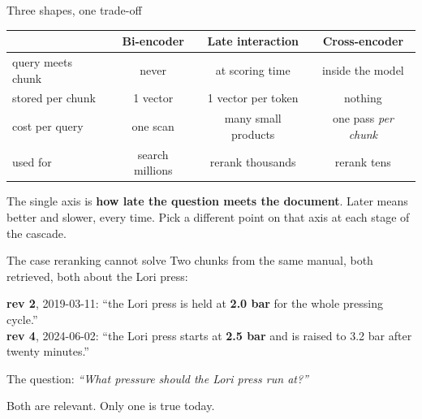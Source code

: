 \documentclass[aspectratio=169]{beamer}
\newcommand{\takebox}[1]{%
  \begin{tcolorbox}[colback=paramgreen!8, colframe=paramgreen, boxrule=0.6pt, arc=2pt]
  #1
  \end{tcolorbox}}
\begin{document}
\begin{frame}{Three shapes, one trade-off}
  \vspace{0.7em}
  \begin{center}
  \small
  \begin{tabular}{lccc}
    \toprule
    & \textbf{Bi-encoder} & \textbf{Late interaction} & \textbf{Cross-encoder} \\
    \midrule
    query meets chunk & never & at scoring time & inside the model \\
    stored per chunk  & 1 vector & 1 vector per token & nothing \\
    cost per query    & one scan & many small products & one pass \emph{per chunk} \\
    used for          & search millions & rerank thousands & rerank tens \\
    \bottomrule
  \end{tabular}
  \end{center}

  \vspace{1.0em}
  \takebox{The single axis is \textbf{how late the question meets the document}. Later means
  better and slower, every time. Pick a different point on that axis at each stage of the
  cascade.}
\end{frame}

\begin{frame}{The case reranking cannot solve}
  \vspace{0.5em}
  Two chunks from the same manual, both retrieved, both about the Lori press:

  \vspace{0.5em}
  \begin{center}
  \begin{tcolorbox}[colback=lightbg, colframe=gray, boxrule=0.5pt, arc=2pt, width=0.92\textwidth]
    \small
    \textbf{rev 2}, 2019-03-11: ``the Lori press is held at \textbf{2.0 bar} for the whole
    pressing cycle.''\\[0.35em]
    \textbf{rev 4}, 2024-06-02: ``the Lori press starts at \textbf{2.5 bar} and is raised to
    3.2 bar after twenty minutes.''
  \end{tcolorbox}
  \end{center}

  \vspace{0.7em}
  \begin{center}
    {\large The question: \textit{``What pressure should the Lori press run at?''}}
  \end{center}

  \vspace{0.7em}
  \begin{center}
  {\small\color{gray}Both are relevant. Only one is true today.}
  \end{center}
\end{frame}
\end{document}
